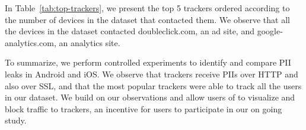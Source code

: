 In Table~\ref{tab:top-trackers}, we present the top 5 trackers ordered according to the number of devices in the \mobWild dataset that contacted them.
We observe that all the devices in the \mobWild dataset contacted doubleclick.com, an ad site, and google-analytics.com, an analytics site. 

To summarize, we perform controlled experiments to identify and compare PII leaks in Android and iOS. 
We observe that trackers receive PIIs over HTTP and also over SSL, and that the most popular trackers were able to track all the users in our \mobWild dataset.
We build on our observations and allow users of \meddle to visualize and block traffic to trackers, an incentive for users to participate in our on going study. 






